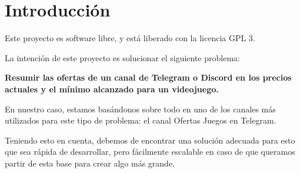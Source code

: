 \chapter{Introducción}

Este proyecto es software libre, y está liberado con la licencia GPL 3\cite{gplv3}.

La intención de este proyecto es solucionar el siguiente problema:

\textbf{Resumir las ofertas de un canal de Telegram o Discord en los precios actuales y el mínimo alcanzado para un videojuego.}

En nuestro caso, estamos basándonos sobre todo en uno de los canales más utilizados para este tipo de problema: el canal Ofertas Juegos en Telegram.

Teniendo esto en cuenta, debemos de encontrar una solución adecuada para esto que sea rápida de desarrollar, pero fácilmente escalable en
caso de que queramos partir de esta base para crear algo más grande.
